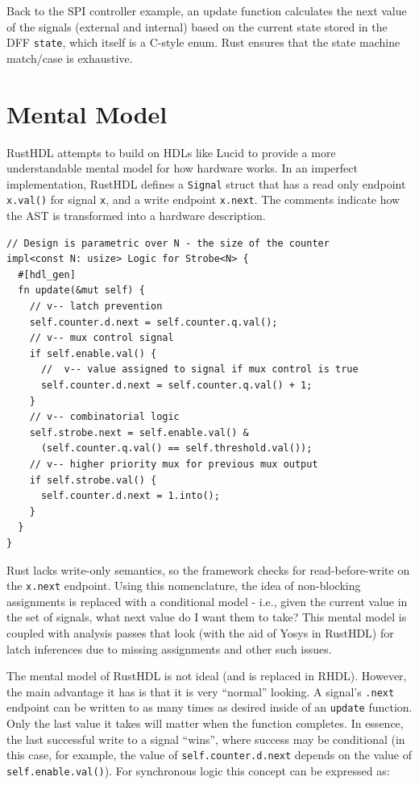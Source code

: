 \documentclass[sigplan,screen,sigconf]{acmart}
\begin{document}
Back to the SPI controller example, an update function calculates the next value of the 
signals (external and internal) based on the current state stored in the DFF \verb|state|,
which itself is a C-style enum.  Rust ensures that the state machine match/case is exhaustive. 

\section{Mental Model}
RustHDL attempts to build on HDLs like Lucid\cite{b11} to provide a more 
understandable mental model for how hardware works.  In an imperfect 
implementation, RustHDL defines a \verb|Signal| struct that has a read only 
endpoint \verb|x.val()| for signal \verb|x|, and a write endpoint \verb|x.next|.    
The comments indicate how the AST is transformed into a hardware description. 

\begin{verbatim}
// Design is parametric over N - the size of the counter
impl<const N: usize> Logic for Strobe<N> {
  #[hdl_gen]
  fn update(&mut self) {
    // v-- latch prevention
    self.counter.d.next = self.counter.q.val();
    // v-- mux control signal
    if self.enable.val() {
      //  v-- value assigned to signal if mux control is true
      self.counter.d.next = self.counter.q.val() + 1;
    }
    // v-- combinatorial logic
    self.strobe.next = self.enable.val() & 
      (self.counter.q.val() == self.threshold.val());
    // v-- higher priority mux for previous mux output
    if self.strobe.val() {
      self.counter.d.next = 1.into();
    }
  }
} 
\end{verbatim}

Rust lacks write-only semantics, so the framework checks for read-before-write on the 
\verb|x.next| endpoint.  Using this nomenclature, the idea of non-blocking assignments 
is replaced with a conditional model - i.e., given the current value in the set of 
signals, what next value do I want them to take?  This mental model is coupled with 
analysis passes that look (with the aid of Yosys\cite{b12} in RustHDL) for latch 
inferences due to missing assignments and other such issues.

The mental model of RustHDL is not ideal (and is replaced in RHDL).  However, the main 
advantage it has is that it is very ``normal'' looking.  A signal's \verb|.next| endpoint 
can be written to as many times as desired inside of an \verb|update| function.  Only 
the last value it takes will matter when the function completes.  In essence, the last 
successful write to a signal ``wins'', where success may be conditional (in this case, 
for example, the value of \verb|self.counter.d.next| depends on the value of 
\verb|self.enable.val()|).  For synchronous logic this concept can be expressed as:
\end{document}
